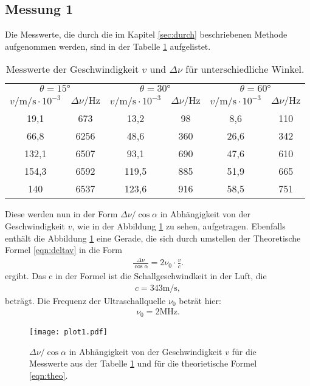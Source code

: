 \subsection{Messung 1}
Die Messwerte, die durch die im Kapitel \ref{sec:durch} beschriebenen Methode
aufgenommen werden, sind in der Tabelle \ref{tab:mess1} aufgelistet.
\begin{table}
  \centering
  \caption{Messwerte der Geschwindigkeit $v$ und $\Delta\nu$ für unterschiedliche Winkel.}
  \label{tab:mess1}
  \begin{tabular}{c c c c c c}
    \toprule
    \multicolumn{2}{c}{ $\theta=15\si{\degree}$ } &  \multicolumn{2}{c}{ $\theta=30\si{\degree}$ } & \multicolumn{2}{c}{ $\theta=60\si{\degree}$ } \\
    $v/\si{\meter\per\second}\cdot10^{-3}$ & $\Delta\nu/\si{\hertz}$ & $v/\si{\meter\per\second}\cdot10^{-3}$ & $\Delta\nu/\si{\hertz}$ & $v/\si{\meter\per\second}\cdot10^{-3}$ & $\Delta\nu/\si{\hertz}$ \\
    \midrule
    19,1  & 673  & 13,2  & 98  & 8,6  & 110\\
    66,8  & 6256 & 48,6  & 360 & 26,6 & 342\\
    132,1 & 6507 & 93,1  & 690 & 47,6 & 610\\
    154,3 & 6592 & 119,5 & 885 & 51,9 & 665\\
    140   & 6537 & 123,6 & 916 & 58,5 & 751\\
    \bottomrule
  \end{tabular}
\end{table}
\FloatBarrier
Diese werden nun in der Form $\Delta\nu/\cos\alpha$ in Abhängigkeit von der Geschwindigkeit $v$, wie in der Abbildung \ref{fig:mess1} zu sehen, aufgetragen.
Ebenfalls enthält die Abbildung \ref{fig:mess1} eine Gerade, die sich durch umstellen der Theoretische Formel \eqref{eqn:deltav} in die Form
\begin{align}
  \frac{\Delta\nu}{\cos{\alpha}}=2\nu_0\cdot\frac{v}{c}.\label{eqn:theo}
\end{align}
ergibt. Das c in der Formel ist die Schallgeschwindkeit in der Luft, die
\begin{align*}
  c=343\si{\meter\per\second},
\end{align*}
beträgt. Die Frequenz der Ultraschallquelle $\nu_0$ beträt hier:
\begin{align}
  \nu_0=2\si{\mega\hertz}.
\end{align}
\FloatBarrier
\begin{figure}
  \texttt{[image: plot1.pdf]}
  \centering
   \caption{$\Delta\nu/\cos\alpha$ in Abhängigkeit von der Geschwindigkeit $v$ für die Messwerte aus der Tabelle \ref{tab:mess1} und für die theorietische Formel \eqref{eqn:theo}.}
  \label{fig:mess1}
\end{figure}

